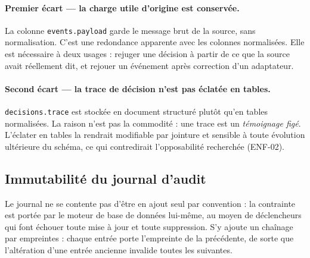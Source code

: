\paragraph{Premier \'ecart --- la charge utile d'origine est conserv\'ee.} La colonne
\texttt{events.payload} garde le message brut de la source, sans normalisation.
C'est une redondance apparente avec les colonnes normalis\'ees. Elle est n\'ecessaire
\`a deux usages : rejuger une d\'ecision \`a partir de ce que la source avait
r\'eellement dit, et rejouer un \'ev\'enement apr\`es correction d'un adaptateur.

\paragraph{Second \'ecart --- la trace de d\'ecision n'est pas \'eclat\'ee en tables.}
\texttt{decisions.trace} est stock\'ee en document structur\'e plut\^ot qu'en tables
normalis\'ees. La raison n'est pas la commodit\'e : une trace est un
\emph{t\'emoignage fig\'e}. L'\'eclater en tables la rendrait modifiable par jointure et
sensible \`a toute \'evolution ult\'erieure du sch\'ema, ce qui contredirait
l'opposabilit\'e recherch\'ee (ENF-02).

\subsection{Immutabilit\'e du journal d'audit}
Le journal ne se contente pas d'\^etre en ajout seul par convention : la contrainte
est port\'ee par le moteur de base de donn\'ees lui-m\^eme, au moyen de d\'eclencheurs qui
font \'echouer toute mise \`a jour et toute suppression. S'y ajoute un cha\^inage par
empreintes : chaque entr\'ee porte l'empreinte de la pr\'ec\'edente, de sorte que
l'alt\'eration d'une entr\'ee ancienne invalide toutes les suivantes.

